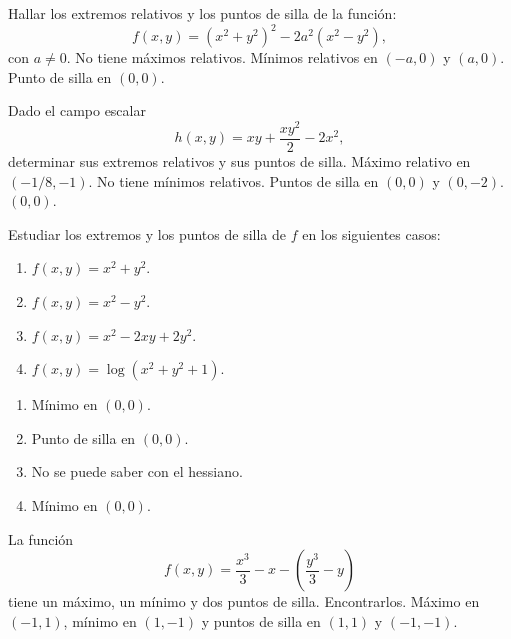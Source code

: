 
{Hallar los extremos relativos y los puntos de silla de la función:
\[
f(x,y) = (x^2+y^2)^2-2a^2(x^2-y^2),
\]
con $a\neq 0$.
}
{No tiene máximos relativos. Mínimos relativos en $(-a,0)$ y $(a,0)$. Punto de silla en $(0,0)$. 
}
{
}


{Dado el campo escalar
\[
h(x,y) = xy+\frac{xy^2}{2}-2x^2,
\]
determinar sus extremos relativos y sus puntos de silla.
}
{Máximo relativo en $(-1/8,-1)$. No tiene mínimos relativos. Puntos de silla en $(0,0)$ y $(0,-2)$.
$(0,0)$.
}
{
}

{Estudiar los extremos y los puntos de silla de $f$ en los siguientes casos:
\begin{enumerate}
\item $f(x,y) = x^2+y^2$.
\item $f(x,y) = x^2-y^2$.
\item $f(x,y) = x^2-2xy+2y^2$.
\item $f(x,y) = \log(x^2+y^2+1)$.
\end{enumerate}
}
{\begin{enumerate}
\item Mínimo en $(0,0)$.
\item Punto de silla en $(0,0)$.
\item No se puede saber con el hessiano.
\item Mínimo en $(0,0)$.
\end{enumerate} 
}
{
}


{La función 
\[
f(x,y) = \frac{x^3}{3}-x-\left(\frac{y^3}{3}-y\right)
\]
tiene un máximo, un mínimo y dos puntos de silla. Encontrarlos.
}
{Máximo en $(-1,1)$, mínimo en $(1,-1)$ y puntos de silla en $(1,1)$ y $(-1,-1)$.
}
{
}



